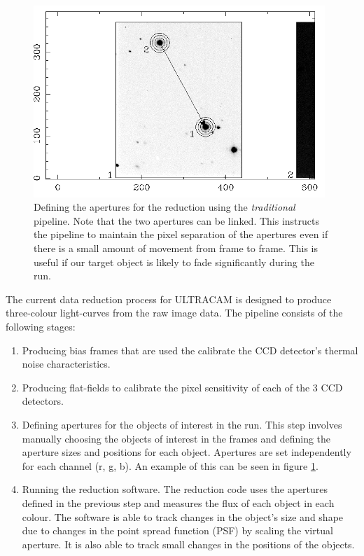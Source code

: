 \begin{figure}
\centering
\includegraphics[width=110mm]{images/setaper.png}
\caption{Defining the apertures for the reduction using the \emph{traditional} pipeline. Note that the two apertures can be linked. This instructs the pipeline to maintain the pixel separation of the apertures even if there is a small amount of movement from frame to frame. This is useful if our target object is likely to fade significantly during the run.}
\label{fig:settingapertures}
\end{figure}

The current data reduction process for ULTRACAM is designed to produce three-colour light-curves from the raw image data. The pipeline consists of the following stages:
\begin{enumerate}
	\item Producing bias frames that are used the calibrate the CCD detector's thermal noise characteristics. 
	\item Producing flat-fields to calibrate the pixel sensitivity of each of the 3 CCD detectors. 
	\item Defining apertures for the objects of interest in the run. This step involves manually choosing the objects of interest in the frames and defining the aperture sizes and positions for each object. Apertures are set independently for each channel (r, g, b). An example of this can be seen in figure \ref{fig:settingapertures}.
	\item Running the reduction software. The reduction code uses the apertures defined in the previous step and measures the flux of each object in each colour. The software is able to track changes in the object's size and shape due to changes in the point spread function (PSF) by scaling the virtual aperture. It is also able to track small changes in the positions of the objects. 
\end{enumerate} 

